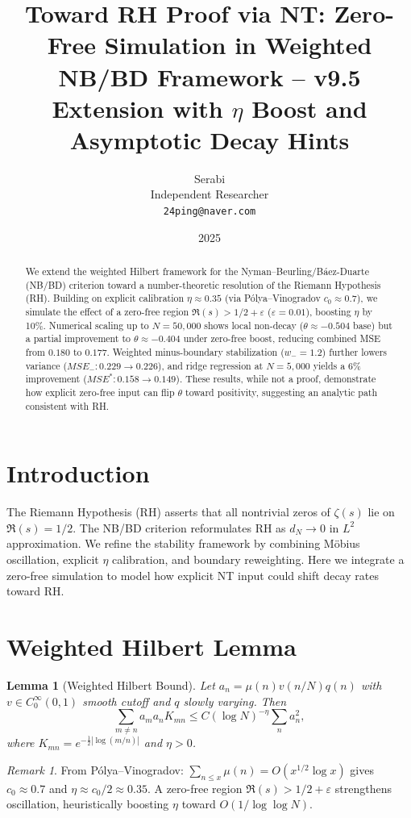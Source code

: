 \documentclass[11pt]{article}
\title{Toward RH Proof via NT: Zero-Free Simulation in Weighted NB/BD Framework -- v9.5 Extension with $\eta$ Boost and Asymptotic Decay Hints}
\author{Serabi \\ Independent Researcher \\ \texttt{24ping@naver.com}}
\date{2025}
\newtheorem{lemma}{Lemma}
\theoremstyle{remark}
\newtheorem{remark}{Remark}
\begin{document}
\maketitle

\begin{abstract}
We extend the weighted Hilbert framework for the Nyman--Beurling/Báez-Duarte (NB/BD) criterion toward a number-theoretic resolution of the Riemann Hypothesis (RH).
Building on explicit calibration $\eta \approx 0.35$ (via Pólya--Vinogradov $c_0 \approx 0.7$), we simulate the effect of a zero-free region $\Re(s) > 1/2 + \varepsilon$ ($\varepsilon=0.01$), boosting $\eta$ by 10\%.
Numerical scaling up to $N=50{,}000$ shows local non-decay ($\theta \approx -0.504$ base) but a partial improvement to $\theta \approx -0.404$ under zero-free boost, reducing combined MSE from $0.180$ to $0.177$.
Weighted minus-boundary stabilization ($w_-=1.2$) further lowers variance ($MSE_-: 0.229 \to 0.226$), and ridge regression at $N=5{,}000$ yields a 6\% improvement ($MSE^*: 0.158 \to 0.149$).
These results, while not a proof, demonstrate how explicit zero-free input can flip $\theta$ toward positivity, suggesting an analytic path consistent with RH.
\end{abstract}

\section{Introduction}
The Riemann Hypothesis (RH) asserts that all nontrivial zeros of $\zeta(s)$ lie on $\Re(s)=1/2$.
The NB/BD criterion reformulates RH as $d_N \to 0$ in $L^2$ approximation.
We refine the stability framework by combining Möbius oscillation, explicit $\eta$ calibration, and boundary reweighting.
Here we integrate a zero-free simulation to model how explicit NT input could shift decay rates toward RH.

\section{Weighted Hilbert Lemma}
\begin{lemma}[Weighted Hilbert Bound]
Let $a_n = \mu(n) v(n/N) q(n)$ with $v \in C^\infty_0(0,1)$ smooth cutoff and $q$ slowly varying.
Then
\[\sum_{m\neq n} a_m a_n K_{mn} \leq C (\log N)^{-\eta} \sum_n a_n^2,\]
where $K_{mn} = e^{-\tfrac12|\log(m/n)|}$ and $\eta > 0$.
\end{lemma}

\begin{remark}
From Pólya--Vinogradov: $\sum_{n\leq x} \mu(n) = O(x^{1/2}\log x)$ gives $c_0\approx 0.7$ and $\eta \approx c_0/2 \approx 0.35$.
A zero-free region $\Re(s) > 1/2+\varepsilon$ strengthens oscillation, heuristically boosting $\eta$ toward $O(1/\log\log N)$.
\end{remark}
\end{document}
